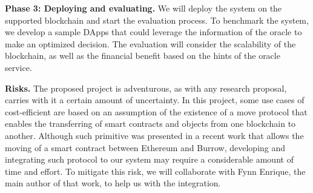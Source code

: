 \textbf{Phase 3: Deploying and evaluating.} We will deploy the system on the supported
blockchain and start the evaluation process. To benchmark the system, we develop a
sample DApps that could leverage the information of the oracle to make an optimized
decision. The evaluation will consider the scalability of the blockchain, as
well as the financial benefit based on the hints of the oracle service.

\textbf{Risks.} The proposed project is adventurous, as with any research
proposal, carries with it a certain amount of uncertainty. In this project, some
use cases of cost-efficient are based on an assumption of the existence of a move
protocol that enables the transferring of smart contracts and objects from one
blockchain to another. Although such primitive was presented in a recent work
\cite{fynn2020move} that allows the moving of a smart contract between Ethereum
and Burrow, developing and integrating such protocol to our system
may require a considerable amount of time and effort. To mitigate this risk, we will
collaborate with Fynn Enrique, the main author of that work, to help us with the
integration.






